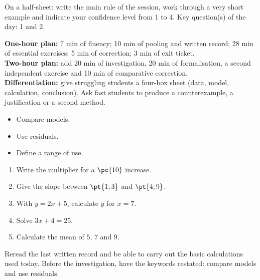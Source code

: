 \begin{exitticket}[3 minutes]On a half-sheet: write the main rule of the session, work through a very short example and indicate your confidence level from 1 to 4. Key question(s) of the day: 1 and 2.\end{exitticket}

\ifmxteacher
\begin{method}
\textbf{One-hour plan:} 7 min of fluency; 10 min of pooling and written record; 28 min of essential exercises; 5 min of correction; 3 min of exit ticket.\\
\textbf{Two-hour plan:} add 20 min of investigation, 20 min of formalisation, a second independent exercise and 10 min of comparative correction.\\
\textbf{Differentiation:} give struggling students a four-box sheet (data, model, calculation, conclusion). Ask fast students to produce a counterexample, a justification or a second method.
\end{method}
\fi
{}
\begin{objectives}\begin{itemize}\item Compare models.\item Use residuals.\item Define a range of use.\end{itemize}\end{objectives}
\begin{fluency}\begin{enumerate}\item Write the multiplier for a $\pc{10}$ increase. \item Give the slope between $\pt{1;3}$ and $\pt{4;9}$. \item With $y=2x+5$, calculate $y$ for $x=7$. \item Solve $3x+4=25$. \item Calculate the mean of $5$, $7$ and $9$. \end{enumerate}\end{fluency}
\begin{prerequisites}Reread the last written record and be able to carry out the basic calculations used today. Before the investigation, have the keywords restated: compare models and use residuals.\end{prerequisites}

